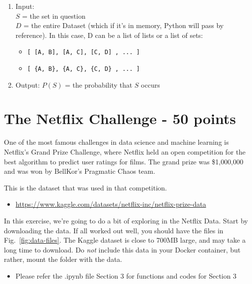 \documentclass[paper=a4, fontsize=11pt]{scrartcl} %
\begin{document}
\begin{enumerate}
      \begin{enumerate}
	      \item Input: \\ $S$ = the set in question \\ $D$ = the entire Dataset (which if it's in memory, Python will pass by reference). In this case, D can be a list of lists or a list of sets: 
		      \begin{itemize}
			      \item \verb"[ [A, B], [A, C], [C, D] , ... ]"
			      \item \verb"[ {A, B}, {A, C}, {C, D} , ... ]"
		      \end{itemize}
      \item Output: $P(S)$ = the probability that $S$ occurs
      \end{enumerate}
\end{enumerate}


\section{The Netflix Challenge - 50 points}

One of the most famous challenges in data science and machine learning is Netflix's Grand Prize Challenge, where Netflix held an open competition for the best algorithm to predict user ratings for films. The grand prize was \$1,000,000 and was won by BellKor's Pragmatic Chaos team. 

This is the dataset that was used in that competition.
\begin{itemize}
    \item \url{https://www.kaggle.com/datasets/netflix-inc/netflix-prize-data}
\end{itemize}

In this exercise, we're going to do a bit of exploring in the Netflix Data. Start by downloading the data. If all worked out well, you should have the files in Fig.~\ref{fig:data-files}. The Kaggle dataset is close to 700MB large, and may take a long time to download. Do \emph{not} include this data in your Docker container, but rather, mount the folder with the data.

\begin{itemize}
\color{red}
    \item Please refer the .ipynb file Section 3 for functions and codes for Section 3
\end{itemize}

\end{document}
